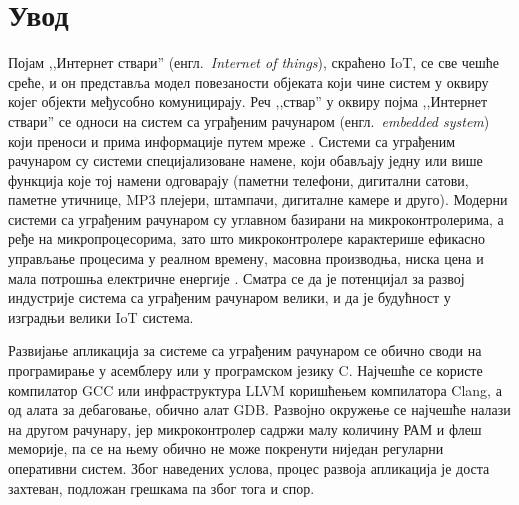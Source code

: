 \documentclass[12pt,oneside]{memoir}
\begin{document}
\frontmatter
\naslovna
\komisija
\apstrakt
\tableofcontents*

\mainmatter

\chapter{Увод}
Појам ,,Интернет ствари'' (енгл.~\textit{Internet of things}), скраћено IoT, се све чешће среће, и он представља модел повезаности објеката који чине систем у оквиру којег објекти међусобно комуницирају. Реч ,,ствар'' у оквиру појма ,,Интернет ствари'' се односи на систем са уграђеним рачунаром (енгл.~\textit{embedded system}) који преноси и прима информације путем мреже \cite{iot}. Системи са уграђеним рачунаром су системи специјализоване намене, који обављају једну или више функција које тој намени одговарају (паметни телефони, дигитални сатови, паметне утичнице, MP3 плејери, штампачи, дигиталне камере и друго). Модерни системи са уграђеним рачунаром су углавном базирани на микроконтролерима, а ређе на микропроцесорима, зато што микроконтролере карактерише ефикасно управљање процесима у реалном времену, масовна производња, ниска цена и мала потрошња електричне енергије \cite{embedded}. Сматра се да је потенцијал за развој индустрије система са уграђеним рачунаром велики, и да је будућност у изградњи велики IoT система.

Развијање апликација за системе са уграђеним рачунаром се обично своди на програмирање у асемблеру или у програмском језику C. Најчешће се користе компилатор GCC или инфраструктура LLVM коришћењем компилатора Clang, а од алата за дебаговање, обично алат GDB. Развојно окружење се најчешће налази на другом рачунару, јер микроконтролер садржи малу количину РАМ и флеш меморије, па се на  њему обично не може покренути ниједан регуларни оперативни систем. Због наведених услова, процес развоја апликација је доста захтеван, подложан грешкама па због тога и спор.
\end{document}
